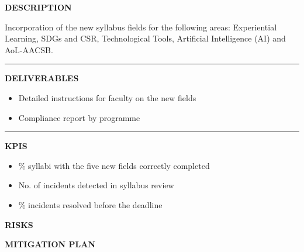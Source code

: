 \documentclass[11pt,a4paper]{scrreprt}
\newcommand{\fieldlabel}[1]{%
  {\footnotesize\sffamily\bfseries\color{mutedcolor}\MakeUppercase{#1}}\par\nopagebreak[4]
}
\newcommand{\fieldsep}{\vspace{3pt}\noindent\textcolor{bordercolor}{\rule{\linewidth}{0.4pt}}\vspace{3pt}\par}
\begin{document}
\begin{tcolorbox}[pabox={gobcolor}{A.P.3.2 \enspace\textbullet\enspace Update of Syllabi}]

\fieldlabel{Description}
{\small Incorporation of the new syllabus fields for the following areas: Experiential Learning, SDGs and CSR, Technological Tools, Artificial Intelligence (AI) and AoL-AACSB.}\par
\fieldsep
\fieldlabel{Deliverables}
{\small \begin{itemize}[noitemsep,topsep=2pt]
\item Detailed instructions for faculty on the new fields
\item Compliance report by programme
\end{itemize}}\par
\fieldsep
\fieldlabel{KPIs}
{\small \begin{itemize}[noitemsep,topsep=2pt]
\item \% syllabi with the five new fields correctly completed
\item No. of incidents detected in syllabus review
\item \% incidents resolved before the deadline
\end{itemize}}\par
\end{tcolorbox}
\begin{tcolorbox}[riskbox]
{\footnotesize\sffamily\bfseries\color{red!50!black} RISKS}\par{}
\end{tcolorbox}
\begin{tcolorbox}[mitbox]
{\footnotesize\sffamily\bfseries\color{green!40!black} MITIGATION PLAN}\par{}
\end{tcolorbox}
\vspace{8pt}
\end{document}
